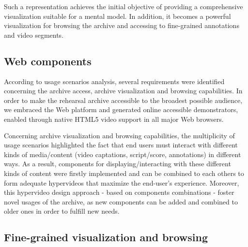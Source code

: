 \documentclass[conference]{IEEEtran}
\newcommand{\todo}[1]{\noindent\textcolor{red}{{\bf \{ToDo} #1{\bf \}}}}
\begin{document}
%
%

Such a representation achieves the initial objective of providing a comprehensive visualization suitable for a mental model. In addition, it becomes a powerful visualization for browsing the archive and accessing to fine-grained annotations and video segments.


\subsection{Web components}
According to usage scenarios analysis, several requirements were identified concerning the archive access, archive visualization and browsing capabilities. In order to make the rehearsal archive accessible to the broadest possible audience, we embraced the Web platform and generated online accessible demonstrators, enabled through native HTML5 video support in all major Web browsers.

Concerning archive visualization and browsing capabilities, the multiplicity of usage scenarios highlighted the fact that end users must interact with different kinds of media/content (video captations, script/score, annotations) in different ways. As a result, components for displaying/interacting with these different kinds of content were firstly implemented and can be combined to each others to form adequate hypervideos that maximize the end-user's experience. Moreover, this hypervideo design approach - based on components combinations - foster novel usages of the archive, as new components can be added and combined to older ones in order to fulfill new needs.

\subsection{Fine-grained visualization and browsing}
\end{document}
